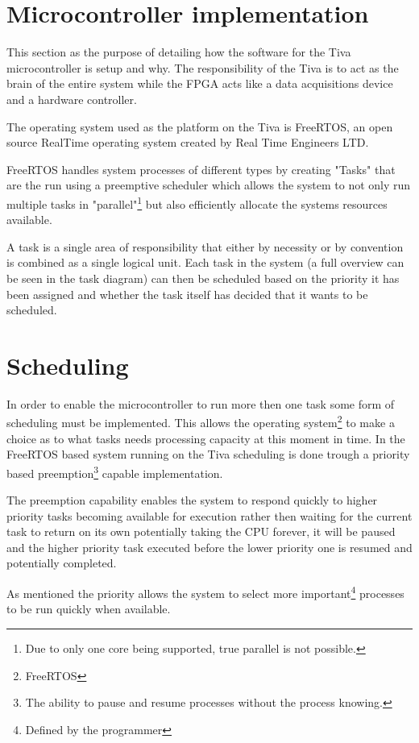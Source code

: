 \documentclass[../../../main]{subfiles}
\begin{document}
\section{Microcontroller implementation}

This section as the purpose of detailing how the software for the Tiva microcontroller is setup and why. The responsibility of the Tiva is to act as the brain of the entire system while the FPGA acts like a data acquisitions device and a hardware controller. 

The operating system used as the platform on the Tiva is FreeRTOS, an open source RealTime operating system created by Real Time Engineers LTD.

FreeRTOS handles system processes of different types by creating "Tasks" that are the run using a preemptive scheduler which allows the system to not only run multiple tasks in "parallel"\footnote{Due to only one core being supported, true parallel is not possible.} but also efficiently allocate the systems resources available.


A task is a single area of responsibility that either by necessity or by convention is combined as a single logical unit. Each task in the system (a full overview can be seen in the task diagram) can then be scheduled based on the priority it has been assigned and whether the task itself has decided that it wants to be scheduled. 

\section{Scheduling}

In order to enable the microcontroller to run more then one task some form of scheduling must be implemented. This allows the operating system\footnote{FreeRTOS} to make a choice as to what tasks needs processing capacity at this moment in time. In the FreeRTOS based system running on the Tiva scheduling is done trough a priority based preemption\footnote{The ability to pause and resume processes without the process knowing.} capable implementation.

The preemption capability enables the system to respond quickly to higher priority tasks becoming available for execution rather then waiting for the current task to return on its own potentially taking the CPU forever, it will be paused and the higher priority task executed before the lower priority one is resumed and potentially completed.
 
As mentioned the priority allows the system to select more important\footnote{Defined by the programmer} processes to be run quickly when available.  
\end{document}
